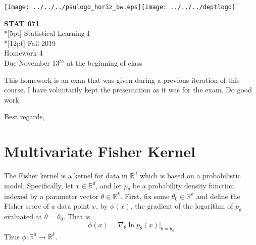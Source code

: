 \documentclass{article}[12pt]
\begin{document}
\thispagestyle{empty}
\texttt{[image: ../../../psulogo\_horiz\_bw.eps]}\hfill\texttt{[image: ../../../deptlogo]}
\vspace{10pt}
\begin{center}
{\large\bf STAT 671}    \\*[5pt] {\Large Statistical Learning I}
\\*[12pt] {\large Fall 2019}
\\ {\large Homework 4}
\\ {\large Due November 13$^{th}$ at the beginning of class}
\end{center}
\vspace{1cm}
\noindent

This homework is an exan that was given during a previous iteration of this course. I have voluntarily kept the presentation as it was for the exam. 
\noindent
Do good work.

\noindent 
Best regards, 
\section{Multivariate Fisher Kernel}
The Fisher kernel is a kernel for data in $\mathbb{R}^d$ which is based on a probabilistic model. Specifically, let $x \in \mathbb{R}^d$, and let $p_{\theta}$ be a probability density function indexed by a parameter vector $\theta \in \mathbb{R}^k$.  First, fix some $\theta_0 \in \mathbb{R}^k$ and define the Fisher score of a data point $x$, by $\phi(x)$, the gradient of the logarithm of $p_{\theta}$ evaluated at $\theta=\theta_0$. That is, 
\begin{equation}
\phi(x)=\nabla_\theta \ln p_{\theta}(x) |_{\theta=\theta_0}
\end{equation}
Thus $\phi: \mathbb{R}^d \to \mathbb{R}^k$. 
\end{document}
